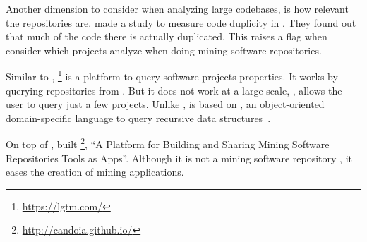 Another dimension to consider when analyzing large codebases, is how relevant the repositories are.
\cite{lopes_dejavu:_2017} made a study to measure code duplicity in \github{}.
They found out that much of the code there is actually duplicated.
This raises a flag when consider which projects analyze when doing mining software repositories.

Similar to \boa{}, \lgtm{}\footnote{\url{https://lgtm.com/}} is a platform to query software projects properties.
It works by querying repositories from \github{}.
But it does not work at a large-scale, \ie{}, \lgtm{} allows the user to query just a few projects.
Unlike \boa{}, \lgtm{} is based on \ql{}, an object-oriented domain-specific language to query recursive data structures~\cite{avgustinov_ql:_2016}.

On top of \boa{}, \cite{tiwari_candoia:_2017} built \candoia{}\footnote{\url{http://candoia.github.io/}}, ``A Platform for Building and Sharing Mining Software Repositories Tools as Apps''.
Although it is not a mining software repository \perse{}, it eases the creation of mining applications.

